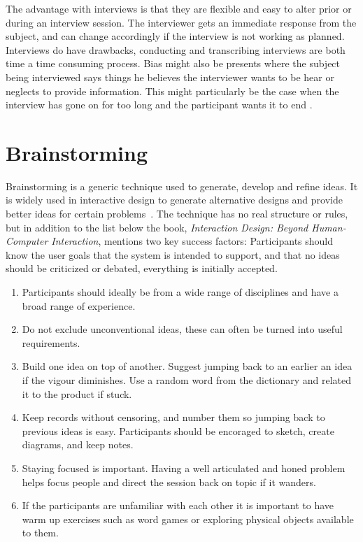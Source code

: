 The advantage with interviews is that they are flexible and easy to alter prior or during an interview session. The interviewer gets an immediate response from the subject, and can change accordingly if the interview is not working as planned. Interviews do have drawbacks, conducting and transcribing interviews are both time a time consuming process. Bias might also be presents where the subject being interviewed says things he believes the interviewer wants to be hear or neglects to provide information. This might particularly be the case when the interview has gone on for too long and the participant wants it to end \cite{realWorldResearch}.

\section{Brainstorming}
\label{sec:brainstorming}
Brainstorming is a generic technique used to generate, develop and refine ideas. It is widely used in interactive design to generate alternative designs and provide better ideas for certain problems~\cite{interactionDesign}. The technique has no real structure or rules, but in addition to the list below the book, \textit{Interaction Design: Beyond Human-Computer Interaction}, mentions two key success factors: Participants should know the user goals that the system is intended to support, and that no ideas should be criticized or debated, everything is initially accepted.

\begin{enumerate}
  \item Participants should ideally be from a wide range of disciplines and have a broad range of experience.
  \item Do not exclude unconventional ideas, these can often be turned into useful requirements.
  \item Build one idea on top of another. Suggest jumping back to an earlier an idea if the vigour diminishes. Use a random word from the dictionary and related it to the product if stuck.
  \item Keep records without censoring, and number them so jumping back to previous ideas is easy. Participants should be encoraged to sketch, create diagrams, and keep notes.
  \item Staying focused is important. Having a well articulated and honed problem helps focus people and direct the session back on topic if it wanders.
  \item If the participants are unfamiliar with each other it is important to have warm up exercises such as word games or exploring physical objects available to them.
\end{enumerate}

